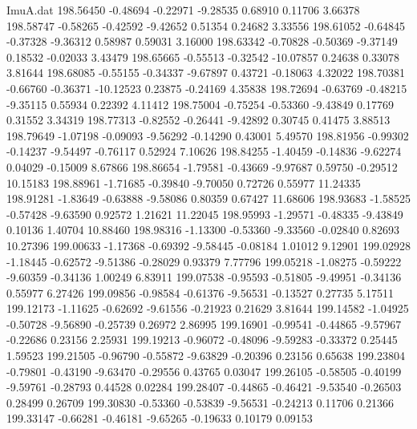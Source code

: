 \begin{filecontents}{ImuA.dat}
 198.56450   -0.48694   -0.22971   -9.28535    0.68910    0.11706    3.66378
 198.58747   -0.58265   -0.42592   -9.42652    0.51354    0.24682    3.33556
 198.61052   -0.64845   -0.37328   -9.36312    0.58987    0.59031    3.16000
 198.63342   -0.70828   -0.50369   -9.37149    0.18532   -0.02033    3.43479
 198.65665   -0.55513   -0.32542  -10.07857    0.24638    0.33078    3.81644
 198.68085   -0.55155   -0.34337   -9.67897    0.43721   -0.18063    4.32022
 198.70381   -0.66760   -0.36371  -10.12523    0.23875   -0.24169    4.35838
 198.72694   -0.63769   -0.48215   -9.35115    0.55934    0.22392    4.11412
 198.75004   -0.75254   -0.53360   -9.43849    0.17769    0.31552    3.34319
 198.77313   -0.82552   -0.26441   -9.42892    0.30745    0.41475    3.88513
 198.79649   -1.07198   -0.09093   -9.56292   -0.14290    0.43001    5.49570
 198.81956   -0.99302   -0.14237   -9.54497   -0.76117    0.52924    7.10626
 198.84255   -1.40459   -0.14836   -9.62274    0.04029   -0.15009    8.67866
 198.86654   -1.79581   -0.43669   -9.97687    0.59750   -0.29512   10.15183
 198.88961   -1.71685   -0.39840   -9.70050    0.72726    0.55977   11.24335
 198.91281   -1.83649   -0.63888   -9.58086    0.80359    0.67427   11.68606
 198.93683   -1.58525   -0.57428   -9.63590    0.92572    1.21621   11.22045
 198.95993   -1.29571   -0.48335   -9.43849    0.10136    1.40704   10.88460
 198.98316   -1.13300   -0.53360   -9.33560   -0.02840    0.82693   10.27396
 199.00633   -1.17368   -0.69392   -9.58445   -0.08184    1.01012    9.12901
 199.02928   -1.18445   -0.62572   -9.51386   -0.28029    0.93379    7.77796
 199.05218   -1.08275   -0.59222   -9.60359   -0.34136    1.00249    6.83911
 199.07538   -0.95593   -0.51805   -9.49951   -0.34136    0.55977    6.27426
 199.09856   -0.98584   -0.61376   -9.56531   -0.13527    0.27735    5.17511
 199.12173   -1.11625   -0.62692   -9.61556   -0.21923    0.21629    3.81644
 199.14582   -1.04925   -0.50728   -9.56890   -0.25739    0.26972    2.86995
 199.16901   -0.99541   -0.44865   -9.57967   -0.22686    0.23156    2.25931
 199.19213   -0.96072   -0.48096   -9.59283   -0.33372    0.25445    1.59523
 199.21505   -0.96790   -0.55872   -9.63829   -0.20396    0.23156    0.65638
 199.23804   -0.79801   -0.43190   -9.63470   -0.29556    0.43765    0.03047
 199.26105   -0.58505   -0.40199   -9.59761   -0.28793    0.44528    0.02284
 199.28407   -0.44865   -0.46421   -9.53540   -0.26503    0.28499    0.26709
 199.30830   -0.53360   -0.53839   -9.56531   -0.24213    0.11706    0.21366
 199.33147   -0.66281   -0.46181   -9.65265   -0.19633    0.10179    0.09153

\end{filecontents}
